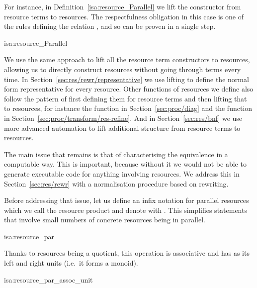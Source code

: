 \documentclass[class=smolathesis,crop=false]{standalone}
\begin{document}
For instance, in Definition~\ref{isa:resource_Parallel} we lift the  constructor from resource terms to resources.
The respectfulness obligation in this case is one of the rules defining the relation \isa{\isasymsim}, and so can be proven in a single step.
\begin{isadef}{isa:resource_Parallel}
  
\end{isadef}

We use the same approach to lift all the resource term constructors to resources, allowing us to directly construct resources without going through terms every time.
In Section~\ref{sec:res/rewr/representative} we use lifting to define the normal form representative for every resource.
Other functions of resources we define also follow the pattern of first defining them for resource terms and then lifting that to resources, for instance the  function in Section~\ref{sec:proc/diag} and the  function in Section~\ref{sec:proc/transform/res-refine}.
And in Section~\ref{sec:res/bnf} we use more advanced automation to lift additional structure from resource terms to resources.

The main issue that remains is that of characterising the equivalence in a computable way.
This is important, because without it we would not be able to generate executable code for anything involving resources.
We address this in Section~\ref{sec:res/rewr} with a normalisation procedure based on rewriting.
\cbend

Before addressing that issue, let us define an infix notation for parallel resources which we call the resource product and denote with \isa{\isasymodot}.
This simplifies statements that involve small numbers of concrete resources being in parallel.
\begin{isadef}{isa:resource_par}
  
\end{isadef}
Thanks to resources being a quotient, this operation is associative and has  as its left and right units (i.e.\ it forms a monoid).
\begin{isalemma}{isa:resource_par_assoc_unit}
  
\item
  
\item
  
\end{isalemma}
\end{document}
